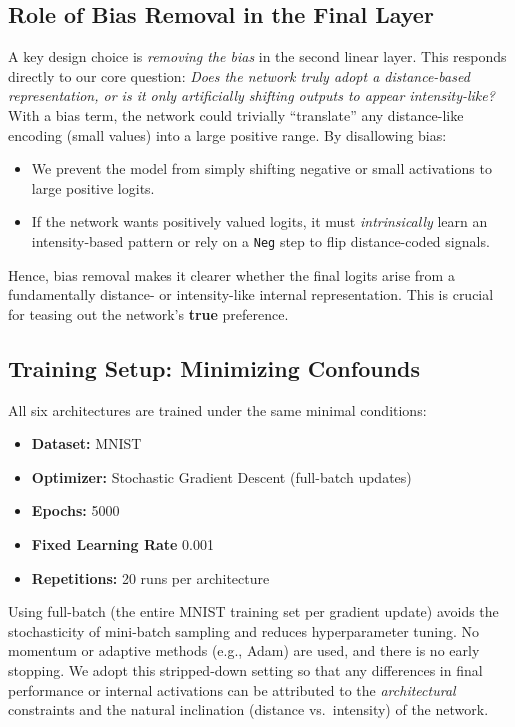 \subsection{Role of Bias Removal in the Final Layer}
\label{sec:bias_removal}
A key design choice is \emph{removing the bias} in the second linear layer. This responds directly to our core question: \emph{Does the network truly adopt a distance-based representation, or is it only artificially shifting outputs to appear intensity-like?} With a bias term, the network could trivially ``translate'' any distance-like encoding (small values) into a large positive range. By disallowing bias:
\begin{itemize}
    \item We prevent the model from simply shifting negative or small activations to large positive logits.
    \item If the network wants positively valued logits, it must \textit{intrinsically} learn an intensity-based pattern or rely on a \texttt{Neg} step to flip distance-coded signals.
\end{itemize}
Hence, bias removal makes it clearer whether the final logits arise from a fundamentally distance- or intensity-like internal representation. This is crucial for teasing out the network’s \textbf{true} preference.

\subsection{Training Setup: Minimizing Confounds}
\label{sec:training_setup}
All six architectures are trained under the same minimal conditions:
\begin{itemize}
    \item \textbf{Dataset:} MNIST
    \item \textbf{Optimizer:} Stochastic Gradient Descent (full-batch updates)
    \item \textbf{Epochs:} 5000
    \item \textbf{Fixed Learning Rate} 0.001
    \item \textbf{Repetitions:} 20 runs per architecture
\end{itemize}
Using full-batch (the entire MNIST training set per gradient update) avoids the stochasticity of mini-batch sampling and reduces hyperparameter tuning. No momentum or adaptive methods (e.g., Adam) are used, and there is no early stopping. We adopt this stripped-down setting so that any differences in final performance or internal activations can be attributed to the \emph{architectural} constraints and the natural inclination (distance vs.\ intensity) of the network.

